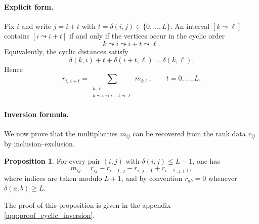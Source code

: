 \documentclass{article}
\theoremstyle{definition}
\newtheorem{proposition}[theorem]{Proposition}
\begin{document}
\paragraph{Explicit form.}
Fix $i$ and write $j=i+t$ with $t=\delta(i,j)\in\{0,\dots,L\}$.
An interval $[k\leadsto \ell]$ contains $[i\leadsto i+t]$
if and only if the vertices occur in the cyclic order
\[
k \leadsto i \leadsto i+t \leadsto \ell .
\]
Equivalently, the cyclic distances satisfy
\[
\delta(k,i)+t+\delta(i+t,\ell)=\delta(k,\ell).
\]
Hence
\begin{equation}\label{eq:cyclic-rank-cumulative}
r_{i,\,i+t}
=
\sum_{\substack{k,\ell\\
k\leadsto i\leadsto i+t\leadsto \ell}}
m_{k\ell},
\qquad t=0,\dots,L.
\end{equation}

\paragraph{Inversion formula.}
We now prove that the multiplicities $m_{ij}$ can be recovered from the
rank data $r_{ij}$ by inclusion--exclusion.

\begin{proposition}\label{prop:cyclic-inversion}
For every pair $(i,j)$ with $\delta(i,j)\le L - 1$, one has
\begin{equation}\label{eq:cyclic-inversion}
m_{ij}
=
r_{ij}
-
r_{i-1,\,j}
-
r_{i,\,j+1}
+
r_{i-1,\,j+1},
\end{equation}
where indices are taken modulo $L+1$, and by convention
$r_{ab}=0$ whenever $\delta(a,b)\ge L$.
\end{proposition}
\noindent
The proof of this proposition is given in the appendix \ref{app:proof_cyclic_inversion}.
\end{document}
